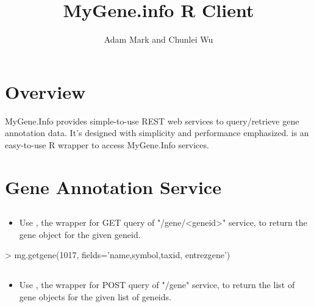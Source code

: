 \documentclass[12pt]{article}
\title{MyGene.info R Client}
\author{Adam Mark and Chunlei Wu}
\begin{document}


\maketitle

\tableofcontents

\section{Overview}

MyGene.Info provides simple-to-use REST web services to query/retrieve gene annotation data. It's designed with simplicity and performance emphasized.  is an easy-to-use R wrapper to access MyGene.Info services.
\section{Gene Annotation Service}

\subsection{}

\begin{itemize}
\item Use , the wrapper for GET query of "/gene/<geneid>" service, to return the gene object for the given geneid.
\end{itemize} 


\begin{Schunk}
\begin{Sinput}
> mg.getgene(1017, fields='name,symbol,taxid, entrezgene')
\end{Sinput}
\end{Schunk}

\subsection{}

\begin{itemize}
\item Use , the wrapper for POST query of "/gene" service, to return the list of gene objects for the given list of geneids.
\end{itemize} 
\end{document}
